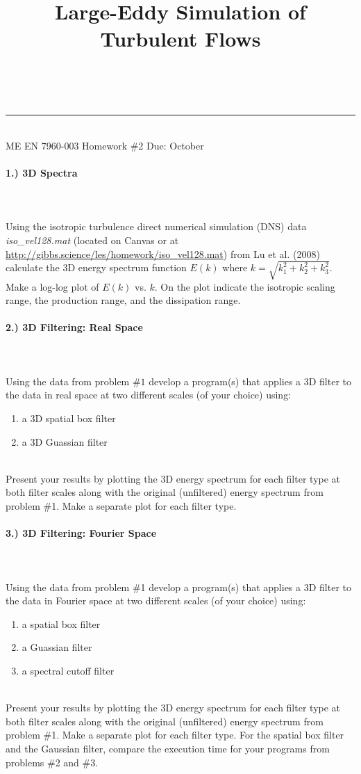 \documentclass[11pt]{article}
\makeatletter
\newcommand{\linia}{\rule{\linewidth}{0.5pt}}
\renewcommand{\maketitle}{
\begin{center}
\vspace{2ex}
{\huge \textsc{\@title}}
\vspace{1ex}
\\
\linia\\
ME EN 7960-003 \hfill Homework \#2 \hfill Due: October \nth{7}
\vspace{4ex}
\end{center}
}
\makeatother
\begin{document}
\title{Large-Eddy Simulation of Turbulent Flows}

\maketitle

\vspace{-20pt}
\paragraph{1.) 3D Spectra}~\\\\
Using the isotropic turbulence direct numerical simulation (DNS) data \textit{iso\_vel128.mat} (located on Canvas or at \href{http://gibbs.science/les/homework/iso_vel128.mat}{http://gibbs.science/les/homework/iso\_vel128.mat}) from Lu et al. (2008) calculate the 3D energy spectrum function $E(k)$ where $k = \sqrt{k_1^2 + k_2^2 + k_3^2}$. Make a log-log plot of $E(k)$ vs. $k$. On the plot indicate the isotropic scaling range, the production range, and the dissipation range.
 
\paragraph{2.) 3D Filtering: Real Space}~\\\\
Using the data from problem $\#1$ develop a program(s) that applies a 3D filter to the data in real space at two different scales (of your choice) using:
\begin{enumerate}[label=(\alph*),topsep=-10pt]
	\item a 3D spatial box filter
	\item a 3D Guassian filter
\end{enumerate}
~\\
Present your results by plotting the 3D energy spectrum for each filter type at both filter scales along with the original (unfiltered) energy spectrum from problem \#1. Make a separate plot for each filter type.

\paragraph{3.) 3D Filtering: Fourier Space}~\\\\
Using the data from problem \#1 develop a program(s) that applies a 3D filter to the data in Fourier space at two different scales (of your choice) using:
\begin{enumerate}[label=(\alph*),topsep=-10pt]
	\item a spatial box filter
	\item a Guassian filter
	\item a spectral cutoff filter
\end{enumerate}
~\\
Present your results by plotting the 3D energy spectrum for each filter type at both filter scales along with the original (unfiltered) energy spectrum from problem \#1. Make a separate plot for each filter type. For the spatial box filter and the Gaussian filter, compare the execution time for your programs from problems \#2 and \#3.
\end{document}
